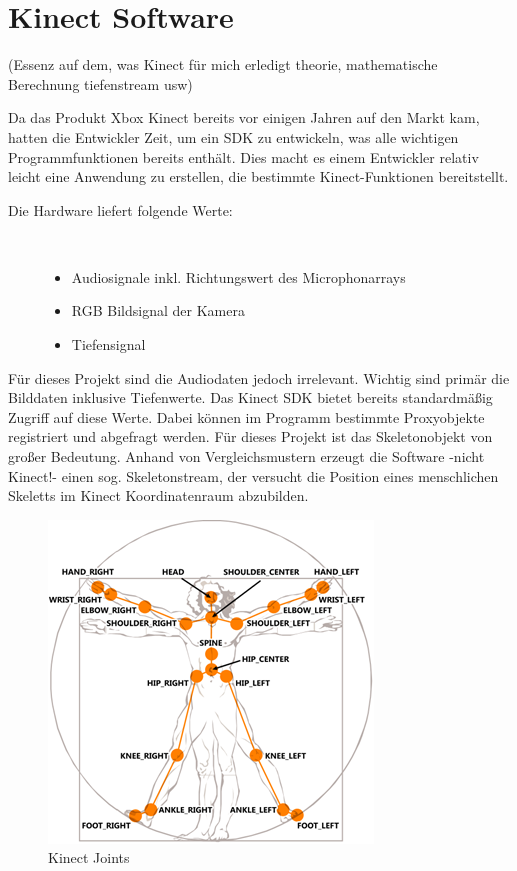 \section{Kinect Software}\label{Software}

(Essenz auf dem, was Kinect für mich erledigt theorie, mathematische Berechnung tiefenstream usw)

Da das Produkt Xbox Kinect bereits vor einigen Jahren auf den Markt kam, hatten die Entwickler Zeit, um ein SDK zu entwickeln, was alle wichtigen Programmfunktionen bereits enthält. Dies macht es einem Entwickler relativ leicht eine Anwendung zu erstellen, die bestimmte Kinect-Funktionen bereitstellt. 

\begin{description}
	\item[Die Hardware liefert folgende Werte:]~\par
	\begin{itemize}
		\item Audiosignale inkl. Richtungswert des Microphonarrays
		\item RGB Bildsignal der Kamera
		\item Tiefensignal
	\end{itemize}
\end{description}

\noindent
Für dieses Projekt sind die Audiodaten jedoch irrelevant. Wichtig sind primär die Bilddaten inklusive Tiefenwerte.
Das Kinect SDK bietet bereits standardmäßig Zugriff auf diese Werte. Dabei können im Programm bestimmte Proxyobjekte registriert und abgefragt werden. Für dieses Projekt ist das Skeletonobjekt von großer Bedeutung. Anhand von Vergleichsmustern erzeugt die Software -nicht Kinect!- einen sog. Skeletonstream, der versucht die Position eines menschlichen Skeletts im Kinect Koordinatenraum abzubilden.\cite{SWB-376536934}

\begin{figure}[H]						
	\centering							
	\includegraphics[scale=1.0]{Bilder/kinect_joints.png}			
	\caption{Kinect Joints \cite{ws:microsoft_jointType}}						
	\label{f:kinect_joints}						
\end{figure}

